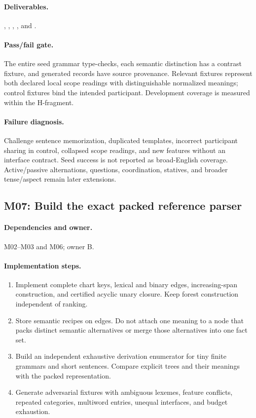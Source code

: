 \documentclass[11pt,a4paper]{article}
\begin{document}
\paragraph{Deliverables.} , , , , and .

\paragraph{Pass/fail gate.} The entire seed grammar type-checks, each semantic distinction has a contrast fixture, and generated records have source provenance. Relevant fixtures represent both declared local scope readings with distinguishable normalized meanings; control fixtures bind the intended participant. Development coverage is measured within the H-fragment.

\paragraph{Failure diagnosis.} Challenge sentence memorization, duplicated templates, incorrect participant sharing in control, collapsed scope readings, and new features without an interface contract. Seed success is not reported as broad-English coverage. Active/passive alternations, questions, coordination, statives, and broader tense/aspect remain later extensions.

\subsection{M07: Build the exact packed reference parser}

\paragraph{Dependencies and owner.} M02--M03 and M06; owner B.

\paragraph{Implementation steps.}
\begin{enumerate}
\item Implement complete chart keys, lexical and binary edges, increasing-span construction, and certified acyclic unary closure. Keep forest construction independent of ranking.
\item Store semantic recipes on edges. Do not attach one meaning to a node that packs distinct semantic alternatives or merge those alternatives into one fact set.
\item Build an independent exhaustive derivation enumerator for tiny finite grammars and short sentences. Compare explicit trees and their meanings with the packed representation.
\item Generate adversarial fixtures with ambiguous lexemes, feature conflicts, repeated categories, multiword entries, unequal interfaces, and budget exhaustion.
\end{enumerate}
\end{document}
